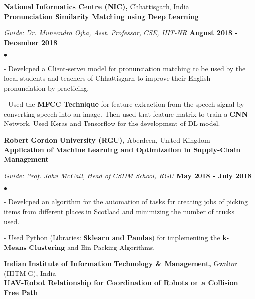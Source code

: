 \documentclass[margin,line]{res}
\newenvironment{list2}{
  \begin{list}{$\bullet$}{%
      \setlength{\itemsep}{0in}
      \setlength{\parsep}{0in} \setlength{\parskip}{0in}
      \setlength{\topsep}{0in} \setlength{\partopsep}{0in} 
      \setlength{\leftmargin}{0.2in}}}{\end{list}}
\begin{document}
\begin{resume}
\vspace{-0.1in}

{\bf National Informatics Centre (NIC),} Chhattisgarh, India\\
{\bf Pronunciation Similarity Matching using Deep Learning}

\vspace{-.3cm}
{\em Guide: Dr. Muneendra Ojha, Asst. Professor, CSE, IIIT-NR} \hfill {\bf August 2018 - December 2018}\\
\vspace*{-.4cm}
\begin{list2}
\item[-] Developed a Client-server model for pronunciation matching to be used by the local students and teachers of Chhattisgarh to improve their English pronunciation by practicing.
\item[-] Used the {\bf MFCC Technique} for feature extraction from the speech signal by converting speech into an image. Then used that feature matrix to train a {\bf CNN} Network. Used Keras and Tensorflow for the development of DL model.
\end{list2}

\vspace{-0.1in}

{\bf Robert Gordon University (RGU),} Aberdeen, United Kingdom\\
{\bf Application of Machine Learning and Optimization in Supply-Chain Management}

\vspace{-.3cm}
{\em Guide: Prof. John McCall, Head of CSDM School, RGU} \hfill {\bf May 2018 - July 2018}\\
\vspace*{-.4cm}
\begin{list2}
\item[-] Developed an algorithm for the automation of tasks for creating jobs of picking items from different places in Scotland and minimizing the number of trucks used.
\item[-] Used Python (Libraries: {\bf Sklearn and Pandas}) for implementing the {\bf k-Means Clustering} and Bin Packing Algorithms.
\end{list2}

\vspace{-.1cm}
{\bf Indian Institute of Information Technology \& Management,} Gwalior (IIITM-G), India\\
{\bf UAV-Robot Relationship for Coordination of Robots on a Collision Free Path}


\end{resume}
\end{document}

